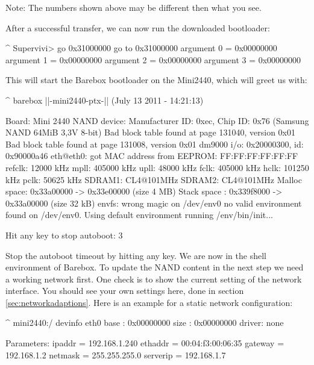 Note: The numbers shown above may be different then what you see.

After a successful transfer, we can now run the downloaded bootloader:

\begin{ptxshell}[escapechar=|]{^}
Supervivi>  go 0x31000000
go to 0x31000000
  argument 0 = 0x00000000
  argument 1 = 0x00000000
  argument 2 = 0x00000000
  argument 3 = 0x00000000
\end{ptxshell}

This will start the Barebox bootloader on the Mini2440, which will
greet us with:

\begin{ptxshell}[escapechar=|]{^}
barebox |\ptxBareboxRev |-mini2440-ptx-|\releasenumber| (July  13 2011 - 14:21:13)

Board: Mini 2440
NAND device: Manufacturer ID: 0xec, Chip ID: 0x76 (Samsung NAND 64MiB 3,3V 8-bit)
Bad block table found at page 131040, version 0x01
Bad block table found at page 131008, version 0x01
dm9000 i/o: 0x20000300, id: 0x90000a46
eth@eth0: got MAC address from EEPROM: FF:FF:FF:FF:FF:FF
refclk:    12000 kHz
mpll:     405000 kHz
upll:      48000 kHz
fclk:     405000 kHz
hclk:     101250 kHz
pclk:      50625 kHz
SDRAM1:   CL4@101MHz
SDRAM2:   CL4@101MHz
Malloc space: 0x33a00000 -> 0x33e00000 (size  4 MB)
Stack space : 0x339f8000 -> 0x33a00000 (size 32 kB)
envfs: wrong magic on /dev/env0
no valid environment found on /dev/env0. Using default environment
running /env/bin/init...

Hit any key to stop autoboot:  3
\end{ptxshell}

Stop the autoboot timeout by hitting any key. We are now in the shell
environment of Barebox. To update the NAND content in the next step we need
a working network first. One check is to show the current setting of the
network interface. You should see your own settings here, done in section
\ref{sec:networkadaptions}. Here is an example for a static network configuration:

\begin{ptxshell}[escapechar=|]{^}
mini2440:/ devinfo eth0
base  : 0x00000000
size  : 0x00000000
driver: none

Parameters:
          ipaddr = 192.168.1.240
         ethaddr = 00:04:f3:00:06:35
         gateway = 192.168.1.2
         netmask = 255.255.255.0
        serverip = 192.168.1.7
\end{ptxshell}

